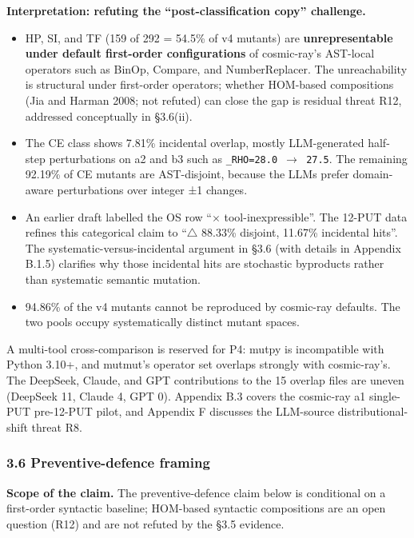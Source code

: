 \documentclass[review,12pt,authoryear]{elsarticle}
\providecommand{\tightlist}{\setlength{\itemsep}{0pt}\setlength{\parskip}{0pt}}
\begin{document}
\textbf{Interpretation: refuting the ``post-classification copy''
challenge.}

\begin{itemize}
\tightlist
\item
  HP, SI, and TF (159 of 292 = 54.5\% of v4 mutants) are
  \textbf{unrepresentable under default first-order configurations} of
  cosmic-ray's AST-local operators such as BinOp, Compare, and
  NumberReplacer. The unreachability is structural under first-order
  operators; whether HOM-based compositions (Jia and Harman 2008; not
  refuted) can close the gap is residual threat R12, addressed
  conceptually in §3.6(ii).
\item
  The CE class shows 7.81\% incidental overlap, mostly LLM-generated
  half-step perturbations on a2 and b3 such as
  \texttt{\_RHO=28.0\ $\to$\ 27.5}. The remaining 92.19\% of CE mutants are
  AST-disjoint, because the LLMs prefer domain-aware perturbations over
  integer ±1 changes.
\item
  An earlier draft labelled the OS row ``$\times$ tool-inexpressible''. The
  12-PUT data refines this categorical claim to ``$\bigtriangleup$ 88.33\% disjoint,
  11.67\% incidental hits''. The systematic-versus-incidental argument
  in §3.6 (with details in Appendix B.1.5) clarifies why those
  incidental hits are stochastic byproducts rather than systematic
  semantic mutation.
\item
  94.86\% of the v4 mutants cannot be reproduced by cosmic-ray defaults.
  The two pools occupy systematically distinct mutant spaces.
\end{itemize}

A multi-tool cross-comparison is reserved for P4: mutpy is incompatible
with Python 3.10+, and mutmut's operator set overlaps strongly with
cosmic-ray's. The DeepSeek, Claude, and GPT contributions to the 15
overlap files are uneven (DeepSeek 11, Claude 4, GPT 0). Appendix B.3
covers the cosmic-ray a1 single-PUT pre-12-PUT pilot, and Appendix F
discusses the LLM-source distributional-shift threat R8.

\subsubsection{3.6 Preventive-defence
framing}\label{preventive-defence-framing}

\textbf{Scope of the claim.} The preventive-defence claim below is
conditional on a first-order syntactic baseline; HOM-based syntactic
compositions are an open question (R12) and are not refuted by the §3.5
evidence.
\end{document}
